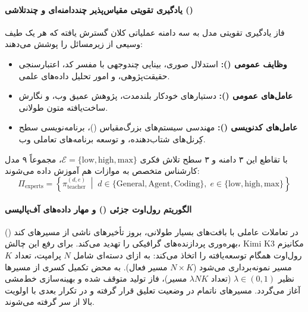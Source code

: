 \paragraph*{یادگیری تقویتی مقیاس‌پذیر چنددامنه‌ای و چندتلاشی ()}
فاز یادگیری تقویتی مدل  به سه دامنه عملیاتی کلان گسترش یافته که هر یک طیف وسیعی از زیرمسائل را پوشش می‌دهند:
\begin{itemize}
    \item \textbf{وظایف عمومی ():} استدلال صوری، بینایی چندوجهی با مفسر کد، اعتبارسنجی حقیقت‌پژوهی، و امور تحلیل داده‌های علمی.
    \item \textbf{عامل‌های عمومی ():} دستیارهای خودکار بلندمدت، پژوهش عمیق وب، و نگارش ساخت‌یافته متون طولانی.
    \item \textbf{عامل‌های کدنویسی ():} مهندسی سیستم‌های بزرگ‌مقیاس ()، برنامه‌نویسی سطح کِرنل‌های شتاب‌دهنده، و توسعه برنامه‌های تعاملی وب.
\end{itemize}

با تقاطع این ۳ دامنه و ۳ سطح تلاش فکری $\mathcal{E} = \{\text{low}, \text{high}, \text{max}\}$، مجموعاً ۹ مدل کارشناس متخصص به موازات هم آموزش داده می‌شوند:
\begin{equation}
    \Pi_{\text{experts}} = \left\{ \pi_{\text{teacher}}^{(d,e)} \;\middle|\; d \in \{\text{General}, \text{Agent}, \text{Coding}\}, \; e \in \{\text{low}, \text{high}, \text{max}\} \right\}
\end{equation}

\paragraph*{الگوریتم رول‌اوت جزئی () و مهار داده‌های آف‌پالیسی}
در تعاملات عاملی با بافت‌های بسیار طولانی، بروز تأخیرهای ناشی از مسیرهای کند () بهره‌وری پردازنده‌های گرافیکی را تهدید می‌کند. برای رفع این چالش، Kimi K3 مکانیزم رول‌اوت همگام توسعه‌یافته را اتخاذ می‌کند:
به ازای دسته‌ای شامل $N$ پرامپت، تعداد $K$ مسیر نمونه‌برداری می‌شود ($N \times K$ مسیر فعال). به محض تکمیل کسری از مسیرها نظیر $\lambda \in (0, 1)$ (تعداد $\lambda N K$ مسیر)، فاز تولید متوقف شده و بهینه‌سازی خط‌مشی آغاز می‌گردد. مسیرهای ناتمام در وضعیت تعلیق قرار گرفته و در تکرار بعدی با اولویت بالا از سر گرفته می‌شوند.

